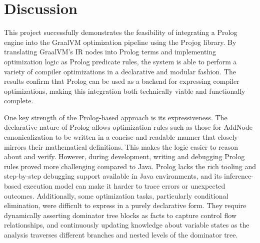 \chapter[Discussion]{Discussion}
This project successfully demonstrates the feasibility of integrating a Prolog engine into the GraalVM optimization pipeline using the Projog library. By translating GraalVM’s IR nodes into Prolog terms and implementing optimization logic as Prolog predicate rules, the system is able to perform a variety of compiler optimizations in a declarative and modular fashion. The results confirm that Prolog can be used as a backend for expressing compiler optimizations, making this integration both technically viable and functionally complete.

One key strength of the Prolog-based approach is its expressiveness. The declarative nature of Prolog allows optimization rules such as those for AddNode canonicalization to be written in a concise and readable manner that closely mirrors their mathematical definitions. This makes the logic easier to reason about and verify. However, during development, writing and debugging Prolog rules proved more challenging compared to Java. Prolog lacks the rich tooling and step-by-step debugging support available in Java environments, and its inference-based execution model can make it harder to trace errors or unexpected outcomes. Additionally, some optimization tasks, particularly conditional elimination, were difficult to express in a purely declarative form. They require dynamically asserting dominator tree blocks as facts to capture control flow relationships, and continuously updating knowledge about variable states as the analysis traverses different branches and nested levels of the dominator tree.

